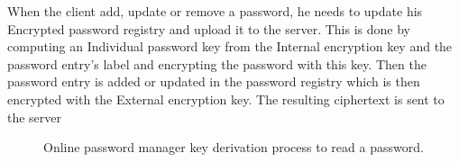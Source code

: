 \documentclass[../report.tex]{subfiles}
\begin{document}
When the client add, update or remove a password, he needs to update his Encrypted password registry and upload it to the server. This is done by computing an Individual password key from the Internal encryption key and the password entry's label and encrypting the password with this key. Then the password entry is added or updated in the password registry which is then encrypted with the External encryption key. The resulting ciphertext is sent to the server



\begin{figure}[h]
 \centering

 \setlength{\fboxsep}{10pt}
 \setlength{\fboxrule}{1pt}

 \caption{Online password manager key derivation process to read a password.}
 \label{fig:Online_password_manager}
\end{figure}
\end{document}
